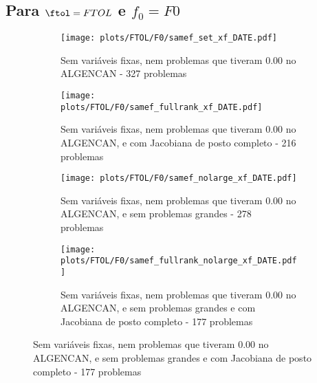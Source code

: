 \newpage
\subsection{Para $\ftol = FTOL$ e $f_0 = F0$}

\begin{figure}[H]
  \centering
  \begin{subfigure}{0.48\textwidth}
    \texttt{[image: plots/FTOL/F0/samef\_set\_xf\_DATE.pdf]}
    \caption{Sem variáveis fixas, nem problemas
      que tiveram 0.00 no ALGENCAN - 327 problemas}
  \end{subfigure}
  \begin{subfigure}{0.48\textwidth}
    \texttt{[image: plots/FTOL/F0/samef\_fullrank\_xf\_DATE.pdf]}
    \caption{Sem variáveis fixas, nem problemas
      que tiveram 0.00 no ALGENCAN, e com Jacobiana de posto completo - 216
      problemas}
  \end{subfigure}
  \begin{subfigure}{0.48\textwidth}
    \texttt{[image: plots/FTOL/F0/samef\_nolarge\_xf\_DATE.pdf]}
    \caption{Sem variáveis fixas, nem problemas
      que tiveram 0.00 no ALGENCAN, e sem problemas grandes - 278 problemas}
  \end{subfigure}
  \begin{subfigure}{0.48\textwidth}
    \texttt{[image: plots/FTOL/F0/samef\_fullrank\_nolarge\_xf\_DATE.pdf]}
    \caption{Sem variáveis fixas, nem problemas
      que tiveram 0.00 no ALGENCAN, e sem problemas grandes e com Jacobiana de
      posto completo - 177 problemas}
  \end{subfigure}
\end{figure}

